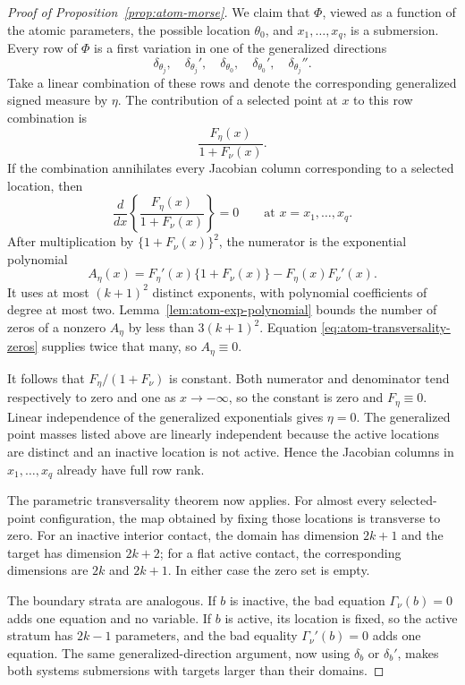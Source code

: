 \begin{proof}[Proof of Proposition~\ref{prop:atom-morse}]
We claim that \(\Phi\), viewed as a function of the atomic parameters, the
possible location \(\theta_0\), and \(x_1,\ldots,x_q\), is a submersion.
Every row of \(\Phi\) is a first variation in one of the generalized
directions
\[
    \delta_{\theta_j},\quad
    \delta_{\theta_j}',\quad
    \delta_{\theta_0},\quad
    \delta_{\theta_0}',\quad
    \delta_{\theta_j}''.
\]
Take a linear combination of these rows and denote the corresponding
generalized signed measure by \(\eta\). The contribution of a selected point
at \(x\) to this row combination is
\[
    \frac{F_\eta(x)}{1+F_\nu(x)}.
\]
If the combination annihilates every Jacobian column corresponding to a
selected location, then
\begin{equation}
\label{eq:atom-transversality-zeros}
    \frac d{dx}\left\{\frac{F_\eta(x)}{1+F_\nu(x)}\right\}=0
    \qquad\text{at }x=x_1,\ldots,x_q.
\end{equation}
After multiplication by \(\{1+F_\nu(x)\}^2\), the numerator is the
exponential polynomial
\[
    A_\eta(x)
    =F_\eta'(x)\{1+F_\nu(x)\}-F_\eta(x)F_\nu'(x).
\]
It uses at most \((k+1)^2\) distinct exponents, with polynomial
coefficients of degree at most two. Lemma~\ref{lem:atom-exp-polynomial}
bounds the number of zeros of a nonzero \(A_\eta\) by less than
\(3(k+1)^2\). Equation \eqref{eq:atom-transversality-zeros} supplies twice
that many, so \(A_\eta\equiv0\).

It follows that \(F_\eta/(1+F_\nu)\) is constant. Both numerator and
denominator tend respectively to zero and one as \(x\to-\infty\), so the
constant is zero and \(F_\eta\equiv0\). Linear independence of the
generalized exponentials gives \(\eta=0\). The generalized point masses
listed above are linearly independent because the active locations are
distinct and an inactive location is not active. Hence the Jacobian columns
in \(x_1,\ldots,x_q\) already have full row rank.

The parametric transversality theorem
\cite[Chapter~2]{guillemin2010differential} now applies. For almost every
selected-point configuration, the map obtained by fixing those locations is
transverse to zero. For an inactive interior contact, the domain has
dimension \(2k+1\) and the target has dimension \(2k+2\); for a flat active
contact, the corresponding dimensions are \(2k\) and \(2k+1\). In either
case the zero set is empty.

The boundary strata are analogous. If \(b\) is inactive, the bad equation
\(\Gamma_\nu(b)=0\) adds one equation and no variable. If \(b\) is active,
its location is fixed, so the active stratum has \(2k-1\) parameters, and
the bad equality \(\Gamma_\nu'(b)=0\) adds one equation. The same
generalized-direction argument, now using \(\delta_b\) or \(\delta_b'\),
makes both systems submersions with targets larger than their domains.


\end{proof}
